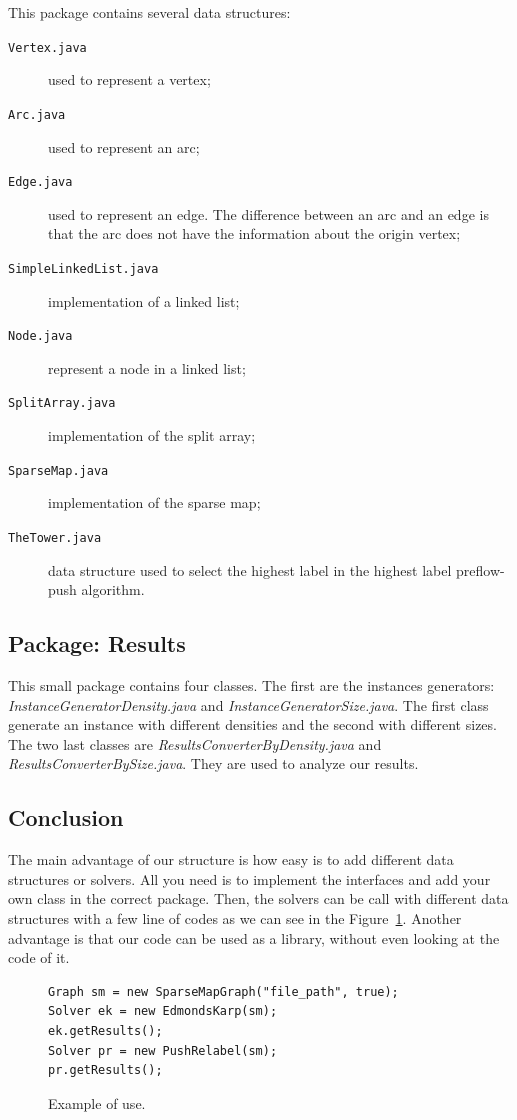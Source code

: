 This package contains several data structures: 
\begin{description}
	\item[\texttt{Vertex.java}] used to represent a vertex;
	\item[\texttt{Arc.java}] used to represent an arc;
	\item[\texttt{Edge.java}] used to represent an edge. The difference between an arc and an edge is that the arc does not have the information about the origin vertex;
	\item[\texttt{SimpleLinkedList.java}] implementation of a linked list;
	\item[\texttt{Node.java}] represent a node in a linked list;
	\item[\texttt{SplitArray.java}] implementation of the split array;
	\item[\texttt{SparseMap.java}] implementation of the sparse map;
	\item[\texttt{TheTower.java}] data structure used to select the highest label in the highest label preflow-push algorithm.
\end{description}

\subsection{Package: Results}

This small package contains four classes. The first are the instances generators: \textit{InstanceGeneratorDensity.java} and \textit{InstanceGeneratorSize.java}. The first class generate an instance with different densities and the second with different sizes. The two last classes are \textit{ResultsConverterByDensity.java} and \textit{ResultsConverterBySize.java}. They are used to analyze our results.

\subsection{Conclusion}


The main advantage of our structure is how easy is to add different data structures or solvers. All you need is to implement the interfaces and add your own class in the correct package. Then, the solvers can be call with different data structures with a few line of codes as we can see in the Figure~\ref{simple_code}. Another advantage is that our code can be used as a library, without even looking at the code of it.

\begin{figure}
\begin{lstlisting}
Graph sm = new SparseMapGraph("file_path", true);
Solver ek = new EdmondsKarp(sm);
ek.getResults();
Solver pr = new PushRelabel(sm);
pr.getResults();
\end{lstlisting}
\caption{Example of use.}
\label{simple_code}
\end{figure}

